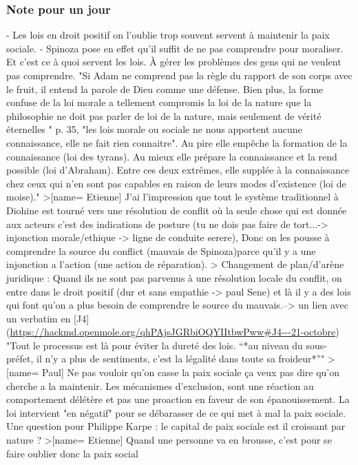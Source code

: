 \subsubsection{Note pour un jour}
 - Les lois en droit positif on l'oublie trop souvent servent à maintenir la paix sociale.
 - Spinoza pose en effet qu'il suffit de ne pas comprendre pour moraliser. Et c'est ce à quoi servent les lois. À gérer les problèmes des gens qui ne veulent pas comprendre. "Si Adam ne comprend pas la règle du rapport de son corps avec le fruit, il entend la parole de Dieu comme une défense. Bien plus, la forme confuse de la loi morale a tellement compromis la loi de la nature que la philosophie ne doit pas parler de loi de la nature, mais seulement de vérité éternelles "  p. 35, "les lois morale ou sociale ne nous apportent aucune connaissance, elle ne fait rien connaitre". Au pire elle empêche la formation de la connaissance (loi des tyrans). Au mieux elle prépare la connaissance et la rend possible (loi d'Abraham). Entre ces deux extrêmes, elle supplée à la connaissance chez ceux qui n'en sont pas capables en raison de leurs modes d'existence (loi de moise)."
>[name= Etienne] J'ai l'impression que tout le système traditionnel à Diohine est tourné vers une résolution de conflit où la seule chose qui est donnée aux acteurs c'est des indications de posture (tu ne dois pas faire de tort...-> injonction morale/ethique -> ligne de conduite serere), Donc on les pousse à comprendre la source du conflict (mauvais de Spinoza)parce qu'il y a une injonction a l'action (une action de réparation).
>
 Changement de plan/d'arène juridique : Quand ils ne sont pas parvenus à une résolution locale du conflit, on entre dans le droit positif (dur et sans empathie -> paul Sene) et là il y a des lois qui font qu'on a plus besoin de comprendre le source du mauvais.--> un lien avec un verbatim en [J4](\url{https://hackmd.openmole.org/qhPAjsJGRbiOQYIItbwPww#J4---21-octobre}) "Tout le processus est là pour éviter la dureté des lois. “*au niveau du sous-préfet, il n’y a plus de sentiments, c’est la légalité dans toute sa froideur*”"
>[name= Paul] Ne pas vouloir qu'on casse la paix sociale ça veux pas dire qu'on cherche a la maintenir. Les mécanismes d'exclusion, sont une réaction au comportement délétère et pas une proaction en faveur de son épanouissement. La loi intervient "en négatif" pour se débarasser de ce qui met à mal la paix sociale. Une question pour Philippe Karpe : le capital de paix sociale est il croissant par nature ?
>[name= Etienne] Quand une personne va en brousse, c'est pour se faire oublier donc la paix social


